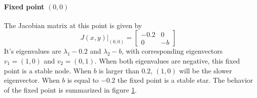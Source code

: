 \paragraph{Fixed point $(0,0)$}\hfill\newline
The Jacobian matrix at this point is given by 
\begin{equation}
J(x,y)|_{(0,0)}=\begin{bmatrix}
-0.2 & 0 \\
0 & -b
\end{bmatrix}
\end{equation}
It's eigenvalues are $\lambda_1-0.2$ and $\lambda_2-b$, with corresponding eigenvectors $v_1=(1,0)$ and $v_2=(0,1)$. When both eigenvalues are negative, this fixed point is a stable node. When $b$ is larger than $0.2$, $(1,0)$ will be the slower eigenvector. When $b$ is equal to $-0.2$ the fixed point is a stable star. The behavior of the fixed point is summarized in figure \ref{fig:ex300}.
\begin{figure}[H]
\centering
{}\hspace{18pt}
\caption{}
\label{fig:ex300}
\end{figure}
